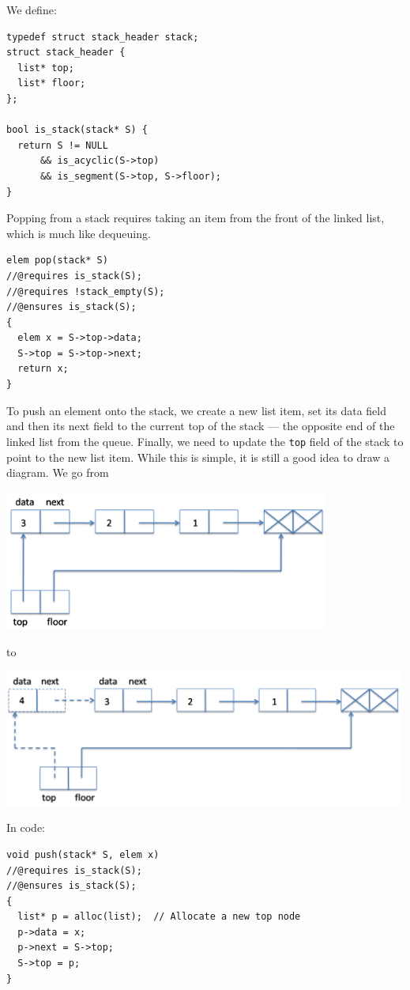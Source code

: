 We define:
\begin{lstlisting}[language={[C0]C}]
typedef struct stack_header stack;
struct stack_header {
  list* top;
  list* floor;
};

bool is_stack(stack* S) {
  return S != NULL
      && is_acyclic(S->top)
      && is_segment(S->top, S->floor);
}
\end{lstlisting}

Popping from a stack requires taking an item from the front of the
linked list, which is much like dequeuing.
\begin{lstlisting}[language={[C0]C}]
elem pop(stack* S)
//@requires is_stack(S);
//@requires !stack_empty(S);
//@ensures is_stack(S);
{
  elem x = S->top->data;
  S->top = S->top->next;
  return x;
}
\end{lstlisting}

To push an element onto the stack, we create a new list item, set its
data field and then its next field to the current top of the stack ---
the opposite end of the linked list from the queue.
Finally, we need to update the \lstinline'top' field of the stack to point
to the new list item.  While this is simple, it is still a good idea
to draw a diagram.  We go from
\begin{center}
\includegraphics[width=0.8\textwidth]{img/stack1.png}
\end{center}
to
\begin{center}
\includegraphics[width=0.99\textwidth]{img/stack2.png}
\end{center}
In code:
\begin{lstlisting}[language={[C0]C}]
void push(stack* S, elem x)
//@requires is_stack(S);
//@ensures is_stack(S);
{
  list* p = alloc(list);  // Allocate a new top node
  p->data = x;
  p->next = S->top;
  S->top = p;
}
\end{lstlisting}

